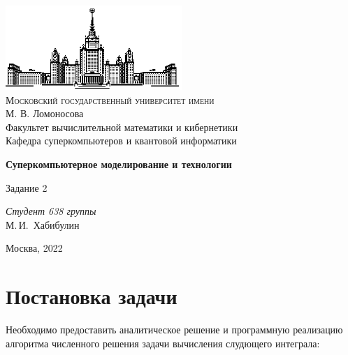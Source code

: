 \documentclass[a4paper, 12pt]{article}
\begin{document}
\thispagestyle{empty}

\begin{center}
\vspace{-3cm}
\includegraphics[width=0.5\textwidth]{sources/msu.eps}\\
{\scshape Московский государственный университет имени}\\
М. В. Ломоносова\\
Факультет вычислительной математики и кибернетики\\
Кафедра суперкомпьютеров и квантовой информатики

\vfill


\vspace{1cm}

{\Huge\bfseries Суперкомпьютерное моделирование и технологии}\\

\vspace{1cm}

{\LARGE Задание 2}
\end{center}

\vspace{1cm}

\begin{flushright}
  \large
  \textit{Студент 638 группы}\\
  М.\,И.~Хабибулин

  \vspace{5mm}

\end{flushright}

\vfill

\begin{center}
Москва, 2022
\end{center}

\newpage
\setcounter{tocdepth}{2}
\tableofcontents

\newpage
\normalsize

\section{Постановка задачи}

    Необходимо предоставить аналитическое решение и программную реализацию алгоритма численного решения задачи вычисления слудющего интеграла:
    
\end{document}
